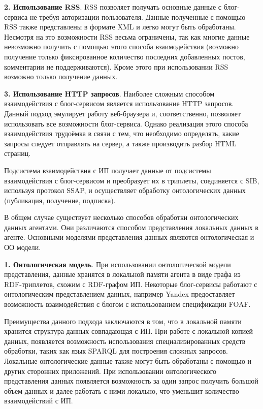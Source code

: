 {\bf 2. Использование RSS}.
RSS позволяет получать основные данные с блог-сервиса не требуя авторизации пользователя. Данные полученные с помощью RSS также представлены в формате XML и легко могут быть обработаны. Несмотря на это возможности RSS весьма ограничены, так как многие данные невозможно получить с помощью этого способа взаимодействия (возможно получение только фиксированное количество последних добавленных постов, комментарии не поддерживаются). Кроме этого при использовании RSS возможно только получение данных.

{\bf 3. Использование HTTP запросов}. 
Наиболее сложным способом взаимодействия с блог-сервисом является использование HTTP запросов. Данный подход эмулирует работу веб-браузера и, соответственно, позволяет использовать все возможности блог-сервиса. Однако реализация этого способа взаимодействия трудоёмка в связи с тем, что необходимо определять, какие запросы следует отправлять на сервер, а также производить разбор HTML страниц.


Подсистема взаимодействия с ИП получает данные от подсистемы взаимодействия с блог-сервисом и преобразует их в триплеты, соединяется с SIB, используя протокол SSAP, и осуществляет обработку онтологических данных (публикация, получение, подписка).

В общем случае существует несколько способов обработки онтологических данных агентами. Они различаются способом представления локальных данных в агенте. Основными моделями представления данных являются онтологическая и ОО модели.

{\bf 1. Онтологическая модель}.
При использовании онтологической модели представления, данные хранятся в локальной памяти агента в виде графа из RDF-триплетов, схожим с RDF-графом ИП. Некоторые блог-сервисы работают с онтологическим представлением данных, например Yandex предоставляет возможность взаимодействия с блогом с использованием спецификации FOAF.

Преимущества данного подхода заключаются в том, что в локальной памяти хранится структура данных совпадающая с ИП. При работе с локальной копией данных, появляется возможность использования специализированных средств обработки, таких как язык SPARQL для построения сложных запросов. Локальные онтологические данные также могут быть обработаны с помощью и других сторонних приложений. При использовании онтологического представления данных появляется возможность за один запрос получить большой объем данных и далее работать с ними локально, что уменьшит количество взаимодействий с ИП. 


